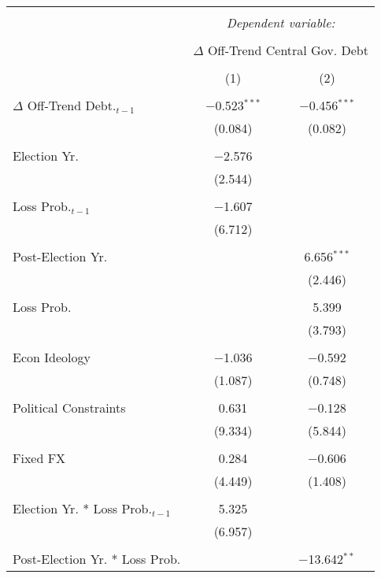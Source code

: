 
\begingroup 
\tiny 
\begin{tabular}{@{\extracolsep{5pt}}lcc} 
\\[-1.8ex]\hline 
\hline \\[-1.8ex] 
 & \multicolumn{2}{c}{\textit{Dependent variable:}} \\ 
\cline{2-3} 
\\[-1.8ex] & \multicolumn{2}{c}{$\Delta$ Off-Trend Central Gov. Debt} \\ 
\\[-1.8ex] & (1) & (2)\\ 
\hline \\[-1.8ex] 
 $\Delta$ Off-Trend Debt.$_{t-1}$ & $-$0.523$^{***}$ & $-$0.456$^{***}$ \\ 
  & (0.084) & (0.082) \\ 
  & & \\ 
 Election Yr. & $-$2.576 &  \\ 
  & (2.544) &  \\ 
  & & \\ 
 Loss Prob.$_{t-1}$ & $-$1.607 &  \\ 
  & (6.712) &  \\ 
  & & \\ 
 Post-Election Yr. &  & 6.656$^{***}$ \\ 
  &  & (2.446) \\ 
  & & \\ 
 Loss Prob. &  & 5.399 \\ 
  &  & (3.793) \\ 
  & & \\ 
 Econ Ideology & $-$1.036 & $-$0.592 \\ 
  & (1.087) & (0.748) \\ 
  & & \\ 
 Political Constraints & 0.631 & $-$0.128 \\ 
  & (9.334) & (5.844) \\ 
  & & \\ 
 Fixed FX & 0.284 & $-$0.606 \\ 
  & (4.449) & (1.408) \\ 
  & & \\ 
 Election Yr. * Loss Prob.$_{t-1}$ & 5.325 &  \\ 
  & (6.957) &  \\ 
  & & \\ 
 Post-Election Yr. * Loss Prob. &  & $-$13.642$^{**}$ \\ 

\end{tabular}
